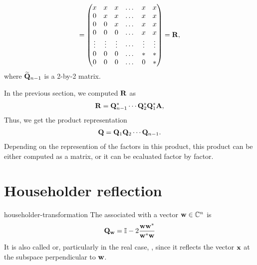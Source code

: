 \begin{intro}
\begin{gather}
    =
    \begin{pmatrix}
      x & x & x & \dots & x & x \\
      0 & x & x & \dots & x & x \\
      0 & 0 & x & \dots & x & x \\
      0 & 0 & 0 & \dots & x & x \\
      \vdots & \vdots & \vdots & \cdots & \vdots & \vdots \\
      0 & 0 & 0 & \dots & * & * \\
      0 & 0 & 0 & \dots & 0 & * \\
    \end{pmatrix} = \mathbf R,
  \end{gather}
  where $\widetilde{\mathbf Q}_{n-1}$ is a 2-by-2 matrix.
\end{intro}

\begin{intro}
  \label{sec:ortho:qr:q-product}
  In the previous section, we computed $\mathbf R$ as
  \begin{gather}
    \mathbf R = \mathbf Q_{n-1}^* \cdots \mathbf Q_{2}^*\mathbf Q_{1}^*\mathbf A,
  \end{gather}
  Thus, we get the product representation
  \begin{gather}
    \label{eq:ortho:1}
    \mathbf Q = \mathbf Q_{1} \mathbf Q_{2} \cdots \mathbf Q_{n-1}.
  \end{gather}
  Depending on the represention of the factors in this product, this
  product can be either computed as a matrix, or it can be ecaluated
  factor by factor.
\end{intro}

\section{Householder reflection}

\begin{Definition}{householder-transformation}
  The 
  associated with a vector $\mathbf w\in\mathbb C^n$ is
  \begin{gather}
    \mathbf Q_{\mathbf w} = \mathbb I - 2\frac{\mathbf w\mathbf w^*}{\mathbf w^*\mathbf w}
  \end{gather}
  It is also called  or, particularly in
  the real case, , since it reflects
  the vector $\mathbf x$ at the subspace perpendicular to $\mathbf w$.
\end{Definition}

